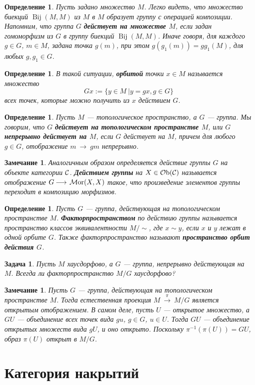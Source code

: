\documentclass[12pt]{book}
\newcommand{\arrow}{{\:\longrightarrow\:}}
\newcommand{\Ob}{\operatorname{{\cal O}b}}
\newcommand{\Mor}{\operatorname{{\cal M}or}}
\newcommand{\cac}{{\cal C}}
\theoremstyle{upshape}
\newtheorem{zadacha}{Задача}[chapter]
\theoremstyle{generic}
\newtheorem{opredelenie}[teorema]{Определение}
\newtheorem{remark}[teorema]{Замечание}
\def\замечание{\begin{remark}}
\def\еза{\end{remark}}
\theoremstyle{upshapenonumber}
\newcommand{\следствие}{%
     \refstepcounter{teorema}
     {\noindent\bf Следствие \thechapter.\arabic{teorema}:\ }}
\newcommand{\пример}{%
     \refstepcounter{teorema}
     {\noindent\bf Пример \thechapter.\arabic{teorema}:\ }}
\newcommand{\лемма}{%
     \refstepcounter{teorema}
     {\noindent\bf Лемма \thechapter.\arabic{teorema}:\ }}
\newcommand{\теорема}{%
     \refstepcounter{teorema}
     {\noindent\bf Теорема \thechapter.\arabic{teorema}:\ }}
\newcommand{\утверждение}{%
     \refstepcounter{teorema}
     {\noindent\bf Утверждение \thechapter.\arabic{teorema}:\ }}
\def\бф{\bf}
\def\ем{\em}
\def\задача{\begin{zadacha}}
\def\ез{\end{zadacha}}
\def\еу{\end{ukazanie}}
\def\определение{\begin{opredelenie}}
\def\ео{\end{opredelenie}}
\def\енум{\begin{enumerate}}
\def\ее{\end{enumerate}}
\begin{document}
\определение
Пусть задано множество $M$. Легко видеть, что множество
биекций $\operatorname{Bij}(M,M)$ из $M$ в $M$ образует группу с операцией
композиции. Напомним, что группа $G$ {\бф действует на множестве $M$},
если задан гомоморфизм из $G$ в группу биекций $\operatorname{Bij}(M,M)$.
Иначе говоря, для каждого $g\in G$, $m\in M$, задана точка
$g(m)$, при этом $g(g_1(m))= gg_1(M)$, для любых $g,
g_1\in G$.
\ео


\определение
В такой ситуации, {\бф орбитой} точки $x\in M$ называется
множество
\[
Gx := \{ y\in M \ | y = gx, g\in G\}
\]
всех точек, которые можно получить из $x$ действием $G$.
\ео


\определение
Пусть $M$ --- топологическое пространство, а $G$ --- группа.
Мы говорим, что $G$ {\бф действует на топологическом пространстве
$M$}, или $G$ {\бф непрерывно действует на $M$}, если
$G$ действует на $M$, причем для любого $g\in G$, отображение
$m \arrow gm$ непрерывно. 
\ео

\замечание
Аналогичным образом определяется действие группы $G$
на объекте категории $\cac$. {\бф Действием группы} на $X\in \Ob(\cac)$
называется отображение $G \arrow \Mor(X,X)$ такое, что
произведение элементов группы переходит в композицию
морфизмов.
\еза

\определение
Пусть $G$ --- группа, действующая на топологическом
пространстве $M$. {\бф Факторпространством} по действию
группы называется пространство классов эквивалентности
$M/\sim$, где $x\sim y$, если $x$ и $y$ лежат в одной
орбите $G$. Также факторпространство называют
{\бф пространство орбит действия $G$}.
\ео

\задача
Пусть $M$ хаусдорфово, а $G$ --- группа, непрерывно
действующая на $M$. Всегда ли факторпространство
$M/G$ хаусдорфово?
\ез

\замечание\label{_quotie_otkry_Zamechanie_}
Пусть $G$ --- группа, действующая на топологическом
пространстве $M$. Тогда естественная проекция
$M\stackrel \pi \arrow M/G$ является открытым
отображением. В самом деле, пусть $U$ --- открытое множество,
а $GU$ --- объединение всех точек вида $gu$,
$g\in G$, $u\in U$. Тогда $GU$ --- объединение 
открытых множеств вида $gU$, и оно открыто. Поскольку 
$\pi^{-1}(\pi(U))= GU$, образ $\pi(U)$ открыт в $M/G$.
\еза




\section{Категория накрытий}
\end{document}
